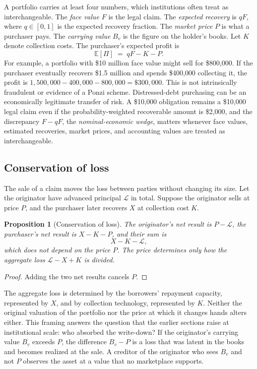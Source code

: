 \documentclass[11pt]{article}
\newtheorem{proposition}[theorem]{Proposition}
\theoremstyle{definition}
\theoremstyle{remark}
\newcommand{\E}{\mathbb{E}}
\begin{document}
A portfolio carries at least four numbers, which institutions often treat as interchangeable. The \emph{face value} $F$ is the legal claim. The \emph{expected recovery} is $qF$, where $q\in[0,1]$ is the expected recovery fraction. The \emph{market price} $P$ is what a purchaser pays. The \emph{carrying value} $B_v$ is the figure on the holder's books. Let $K$ denote collection costs. The purchaser's expected profit is
\[
\E[\Pi]\;=\;qF-K-P .
\]
For example, a portfolio with \$10 million face value might sell for \$800{,}000. If the purchaser eventually recovers \$1.5 million and spends \$400{,}000 collecting it, the profit is $1{,}500{,}000-400{,}000-800{,}000=\$300{,}000$. This is not intrinsically fraudulent or evidence of a Ponzi scheme. Distressed-debt purchasing can be an economically legitimate transfer of risk. A \$10{,}000 obligation remains a \$10{,}000 legal claim even if the probability-weighted recoverable amount is \$2{,}000, and the discrepancy $F-qF$, the \emph{nominal-economic wedge}, matters whenever face values, estimated recoveries, market prices, and accounting values are treated as interchangeable.

\subsection{Conservation of loss}

The sale of a claim moves the loss between parties without changing its size. Let the originator have advanced principal $\mathcal{L}$ in total. Suppose the originator sells at price $P$, and the purchaser later recovers $X$ at collection cost $K$.

\begin{proposition}[Conservation of loss]\label{prop:conserve}
The originator's net result is $P-\mathcal{L}$, the purchaser's net result is $X-K-P$, and their sum is
\[
X-K-\mathcal{L},
\]
which does not depend on the price $P$. The price determines only how the aggregate loss $\mathcal{L}-X+K$ is divided.
\end{proposition}

\begin{proof}
Adding the two net results cancels $P$.
\end{proof}

The aggregate loss is determined by the borrowers' repayment capacity, represented by $X$, and by collection technology, represented by $K$. Neither the original valuation of the portfolio nor the price at which it changes hands alters either. This framing answers the question that the earlier sections raise at institutional scale: who absorbed the write-down? If the originator's carrying value $B_v$ exceeds $P$, the difference $B_v-P$ is a loss that was latent in the books and becomes realized at the sale. A creditor of the originator who sees $B_v$ and not $P$ observes the asset at a value that no marketplace supports.
\end{document}
